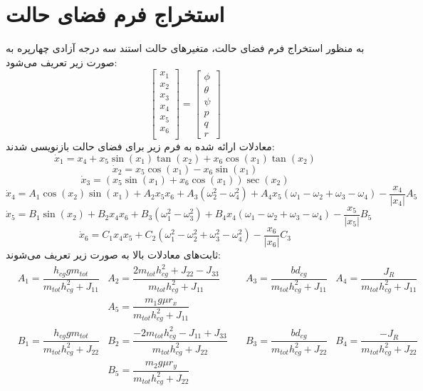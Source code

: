\section{استخراج فرم فضای حالت}\label{spacestate}
به منظور استخراج فرم فضای حالت، متغیرهای حالت استند سه درجه آزادی چهارپره به صورت زیر تعریف می‌شود:
\begin{equation}
	\begin{bmatrix}
		x_1\\x_2\\x_3\\x_4\\x_5\\x_6\\
	\end{bmatrix} = 
\begin{bmatrix}
	\phi\\ \theta \\ \psi \\ p\\ q\\ r
\end{bmatrix}
\end{equation}
معادلات ارائه شده به فرم زیر برای فضای حالت بازنویسی شدند:
\begin{equation}
	\dot x_1 = x_4 + x_5\sin(x_1)\tan(x_2) + x_6\cos(x_1)\tan(x_2)
\end{equation}
\begin{equation}
	\dot x_2 = x_5\cos(x_1)- x_6\sin(x_1)
\end{equation}
\begin{equation}
	\dot x_3 = (x_5\sin(x_1) + x_6\cos(x_1))\sec(x_2)
\end{equation}
\begin{equation}
	\dot x_4 = A_1\cos(x_2)\sin(x_1) + 
	A_2x_5x_6 + A_3\left(\omega_2^2-\omega_4^2\right)+
	A_4x_5\left(\omega_1-\omega_2+\omega_3-\omega_4\right) - \dfrac{x_4}{\lvert x_4\rvert}A_5
\end{equation}
\begin{equation}
	\dot x_5 = B_1\sin(x_2) + 
	B_2x_4x_6 + B_3\left(\omega_1^2-\omega_3^2\right)+
	B_4x_4\left(\omega_1-\omega_2+\omega_3-\omega_4\right) - \dfrac{x_5}{\lvert x_5\rvert}B_5
\end{equation}
\begin{equation}
	\dot x_6 = C_1x_4x_5 + 
	C_2\left(\omega_1^2-\omega_2^2+\omega_3^2-\omega_4^2\right) - \dfrac{x_6}{\lvert x_6\rvert}C_3
\end{equation}
ثابت‌های معادلات بالا  به صورت زیر تعریف می‌شوند:
\begin{align*}
	&A_1  = \dfrac{h_{cg}gm_{tot}}{m_{tot}h_{cg}^2+J_{11}}
	&A_2  = \dfrac{2m_{tot}h_{cg}^2+J_{22}-J_{33}}{m_{tot}h_{cg}^2+J_{11}}\quad
	&A_3  = \dfrac{bd_{cg}}{m_{tot}h_{cg}^2+J_{11}}
	&A_4  = \dfrac{J_R}{m_{tot}h_{cg}^2+J_{11}}\\
	& & A_5 = \dfrac{m_1g\mu r_x}{m_{tot}h_{cg}^2 + J_{11}} & &\\
	&B_1  = \dfrac{h_{cg}gm_{tot}}{m_{tot}h_{cg}^2+J_{22}}
	&B_2  = \dfrac{-2m_{tot}h_{cg}^2-J_{11}+J_{33}}{m_{tot}h_{cg}^2+J_{22}}\quad
	&B_3  = \dfrac{bd_{cg}}{m_{tot}h_{cg}^2+J_{22}}
	&B_4  = \dfrac{-J_R}{m_{tot}h_{cg}^2+J_{22}}\\
	& & B_5 = \dfrac{m_2g\mu r_y}{m_{tot}h_{cg}^2 + J_{22}} & &
\end{align*}
